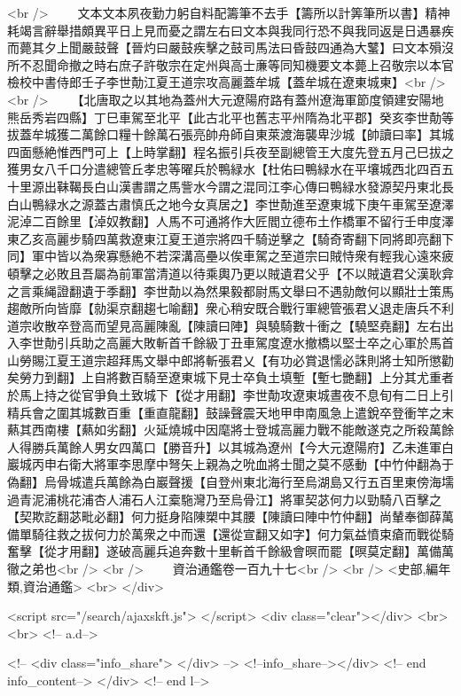 <br />
　　文本文本夙夜勤力躬自料配籌筆不去手【籌所以計筭筆所以書】精神耗竭言辭舉措頗異平日上見而憂之謂左右曰文本與我同行恐不與我同返是日遇暴疾而薨其夕上聞嚴鼓聲【晉灼曰嚴鼓疾擊之鼓司馬法曰昏鼓四通為大鼜】曰文本殞沒所不忍聞命撤之時右庶子許敬宗在定州與高士亷等同知機要文本薨上召敬宗以本官檢校中書侍郎壬子李世勣江夏王道宗攻高麗蓋牟城【蓋牟城在遼東城東】<br />
<br />
　　【北唐取之以其地為蓋州大元遼陽府路有蓋州遼海軍節度領建安陽地熊岳秀岩四縣】丁巳車駕至北平【此古北平也舊志平州隋為北平郡】癸亥李世勣等拔蓋牟城獲二萬餘口糧十餘萬石張亮帥舟師自東萊渡海襲卑沙城【帥讀曰率】其城四面懸絶惟西門可上【上時掌翻】程名振引兵夜至副總管王大度先登五月己巳拔之獲男女八千口分遣總管丘孝忠等曜兵於鴨緑水【杜佑曰鴨緑水在平壤城西北四百五十里源出靺鞨長白山漢書謂之馬訾水今謂之混同江李心傳曰鴨緑水發源契丹東北長白山鴨緑水之源蓋古肅慎氏之地今女真居之】李世勣進至遼東城下庚午車駕至遼澤泥淖二百餘里【淖奴教翻】人馬不可通將作大匠閻立德布土作橋軍不留行壬申度澤東乙亥高麗步騎四萬救遼東江夏王道宗將四千騎逆擊之【騎奇寄翻下同將即亮翻下同】軍中皆以為衆寡懸絶不若深溝高壘以俟車駕之至道宗曰賊恃衆有輕我心遠來疲頓擊之必敗且吾屬為前軍當清道以待乘輿乃更以賊遺君父乎【不以賊遺君父漢耿弇之言乘䋲證翻遺于季翻】李世勣以為然果毅都尉馬文舉曰不遇勍敵何以顯壯士策馬趨敵所向皆靡【勍渠京翻趨七喻翻】衆心稍安既合戰行軍總管張君乂退走唐兵不利道宗收散卒登高而望見高麗陳亂【陳讀曰陣】與驍騎數十衝之【驍堅堯翻】左右出入李世勣引兵助之高麗大敗斬首千餘級丁丑車駕度遼水撤橋以堅士卒之心軍於馬首山勞賜江夏王道宗超拜馬文舉中郎將斬張君乂【有功必賞退懦必誅則將士知所懲勸矣勞力到翻】上自將數百騎至遼東城下見士卒負土填塹【塹七艷翻】上分其尤重者於馬上持之從官爭負土致城下【從才用翻】李世勣攻遼東城晝夜不息旬有二日上引精兵會之圍其城數百重【重直龍翻】鼓譟聲震天地甲申南風急上遣銳卒登衝竿之末爇其西南樓【爇如劣翻】火延燒城中因麾將士登城高麗力戰不能敵遂克之所殺萬餘人得勝兵萬餘人男女四萬口【勝音升】以其城為遼州【今大元遼陽府】乙未進軍白巖城丙申右衛大將軍李思摩中弩矢上親為之吮血將士聞之莫不感動【中竹仲翻為于偽翻】烏骨城遣兵萬餘為白巖聲援【自登州東北海行至烏湖島又行五百里東傍海壖過青泥浦桃花浦杏人浦石人江槖駞灣乃至烏骨江】將軍契苾何力以勁騎八百擊之【契欺訖翻苾毗必翻】何力挺身陷陳槊中其腰【陳讀曰陣中竹仲翻】尚輦奉御薛萬備單騎往救之拔何力於萬衆之中而還【還從宣翻又如字】何力氣益憤束瘡而戰從騎奮擊【從才用翻】遂破高麗兵追奔數十里斬首千餘級會暝而罷【暝莫定翻】萬備萬徹之弟也<br />
<br />
　　資治通鑑卷一百九十七<br />
<br />
<史部,編年類,資治通鑑>  <br>
   </div> 

<script src="/search/ajaxskft.js"> </script>
 <div class="clear"></div>
<br>
<br>
 <!-- a.d-->

 <!--
<div class="info_share">
</div> 
-->
 <!--info_share--></div>   <!-- end info_content-->
  </div> <!-- end l-->

